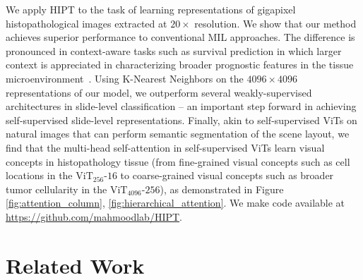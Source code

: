 {We apply HIPT to the task of learning representations of gigapixel histopathological images extracted at $20\times$ resolution. We show that our method achieves superior performance to conventional MIL approaches. The difference is pronounced in context-aware tasks such as survival prediction in which larger context is appreciated in characterizing broader prognostic features in the tissue microenvironment~\cite{pati2022hierarchical, saltz2018spatial, abduljabbar2020geospatial, chen2021multimodal}. Using K-Nearest Neighbors on the $4096 \times 4096$ representations of our model, we outperform several weakly-supervised architectures in slide-level classification -- an important step forward in achieving self-supervised slide-level representations. Finally, akin to self-supervised ViTs on natural images that can perform semantic segmentation of the scene layout, we find that the multi-head self-attention in self-supervised ViTs learn visual concepts in histopathology tissue (from fine-grained visual concepts such as cell locations in the $\operatorname{ViT_{256}\textrm{-}16}$ to coarse-grained visual concepts such as broader tumor cellularity in the $\operatorname{ViT_{4096}\textrm{-}256}$), as demonstrated in Figure \ref{fig:attention_column}, \ref{fig:hierarchical_attention}. We make code available at \href{https://github.com/mahmoodlab/HIPT}{https://github.com/mahmoodlab/HIPT}.

\section{Related Work}
\label{sec:related}

}
